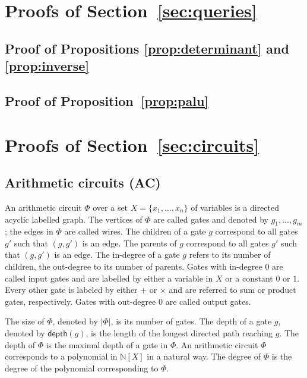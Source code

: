 
\section{Proofs of Section~\ref{sec:queries}}
\subsection{Proof of Propositions \ref{prop:determinant} and \ref{prop:inverse}}


\subsection{Proof of Proposition~\ref{prop:palu}}


\section{Proofs of Section~\ref{sec:circuits}}

\subsection{Arithmetic circuits (AC)}
An arithmetic circuit $\Phi$ over a set $X=\{x_1,\ldots,x_n\}$ of variables is a directed
acyclic labelled graph. The vertices of $\Phi$ are called gates and denoted by $g_1,\ldots,g_m$;
the edges in $\Phi$ are called wires. The children of a gate $g$ correspond to all gates
$g'$ such that $(g,g')$ is an edge. The parents of $g$ correspond to all gates $g'$ 
such that $(g,g')$ is an edge. The in-degree of a gate $g$ refers to its number of children,
the out-degree to its number of parents. Gates with in-degree $0$ are called input gates
and are labelled by either a variable in $X$ or a constant $0$ or $1$. Every other gate
is labeled by either $+$ or $\times$ and are referred to sum or product gates, respectively.
Gates with out-degree $0$ are called output gates.


The size of $\Phi$, denoted by $|\Phi|$, is its number of gates. The depth of a gate $g$, denoted
by $\mathsf{depth}(g)$, is the length of the longest directed path reaching $g$. The depth of $\Phi$
is the maximal depth of a gate in $\Phi$. An arithmetic circuit $\Phi$ corresponds to a polynomial in $\mathbb{N}[X]$ in a natural way. The degree of $\Phi$ is the degree of the polynomial corresponding to $\Phi$.

